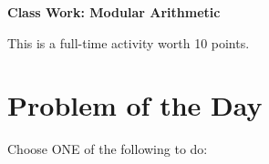 \documentclass[11pt]{article}
\begin{document}
	
	\thispagestyle{empty}
	\renewcommand{\headrulewidth}{0.0pt}
	\thispagestyle{fancy}
	\lfoot{}
	\cfoot{}
	\rfoot{}	
	
	\vspace*{0in}

		\begin{center}
			\begin{large}
			\textbf{Class Work: Modular Arithmetic} \\
			\end{large}
			This is a full-time activity worth 10 points. 
			
		\end{center}
		

\section*{Problem of the Day}

Choose ONE of the following to do: 
 
\end{document}
